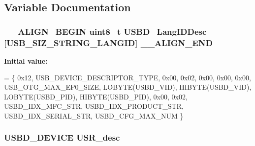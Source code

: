 \subsection{Variable Documentation}
\hypertarget{group__USBD__DESC__Private__Variables_gaad0a5d155cbe499bb18a80f39f807a1c}{
\subsubsection[{\-\_\-\-\_\-\-A\-L\-I\-G\-N\-\_\-\-E\-N\-D}]{\setlength{\rightskip}{0pt plus 5cm}\-\_\-\-\_\-\-A\-L\-I\-G\-N\-\_\-\-B\-E\-G\-I\-N uint8\-\_\-t U\-S\-B\-D\-\_\-\-Lang\-I\-D\-Desc \mbox{[}U\-S\-B\-\_\-\-S\-I\-Z\-\_\-\-S\-T\-R\-I\-N\-G\-\_\-\-L\-A\-N\-G\-I\-D\mbox{]} \-\_\-\-\_\-\-A\-L\-I\-G\-N\-\_\-\-E\-N\-D}}\label{group__USBD__DESC__Private__Variables_gaad0a5d155cbe499bb18a80f39f807a1c}
{\bfseries Initial value\-:}
\begin{DoxyCode}
=
  \{
    0x12,                       
    USB\_DEVICE\_DESCRIPTOR\_TYPE, 
    0x00,                       
    0x02,
    0x00,                       
    0x00,                       
    0x00,                       
    USB\_OTG\_MAX\_EP0\_SIZE,      
    LOBYTE(USBD\_VID),           
    HIBYTE(USBD\_VID),           
    LOBYTE(USBD\_PID),           
    HIBYTE(USBD\_PID),           
    0x00,                       
    0x02,
    USBD\_IDX\_MFC\_STR,           
    USBD\_IDX\_PRODUCT\_STR,       
    USBD\_IDX\_SERIAL\_STR,        
    USBD\_CFG\_MAX\_NUM            
  \}
\end{DoxyCode}
\hypertarget{group__USBD__DESC__Private__Variables_ga7b6c0e09bf9f913c610ff42bad814488}{
\subsubsection[{U\-S\-R\-\_\-desc}]{\setlength{\rightskip}{0pt plus 5cm}U\-S\-B\-D\-\_\-\-D\-E\-V\-I\-C\-E U\-S\-R\-\_\-desc}}\label{group__USBD__DESC__Private__Variables_ga7b6c0e09bf9f913c610ff42bad814488}
